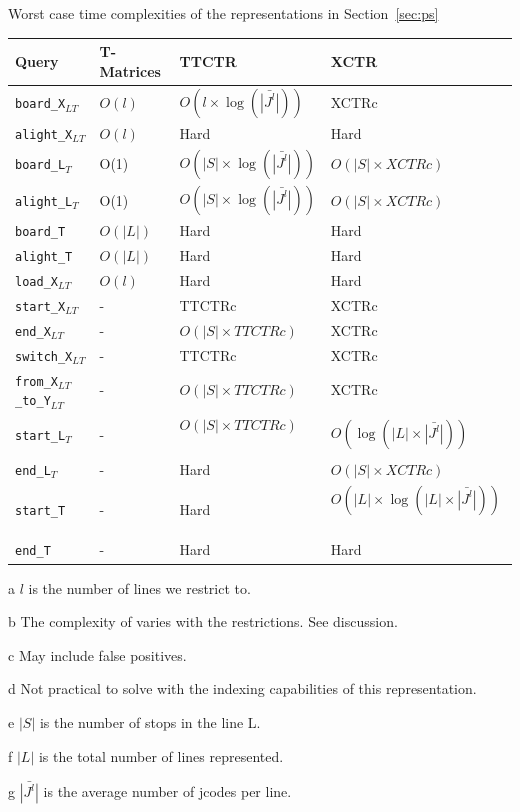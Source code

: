 \documentclass[runningheads]{llncs}
\newcommand{\acumm}{T-Matrices} %
\newcommand{\ctr}{XCTR}
\newcommand{\ttctr}{TTCTR}
\newcommand{\ctrq}{XCTRc}
\newcommand{\ttctrq}{TTCTRc}
\begin{document}
\begin{threeparttable}
\centering
\caption{Worst case time complexities of the representations in Section~\ref{sec:ps}}
\label{tab:queries}
\begin{tabular}{|l|l|l|l|}
\hline
Query &  \acumm & \ttctr & \ctr\\
\hline
\texttt{board\_X$_{LT}$} & $O(l)$\tnote{a} & $O(l\times \log(\bar{|J^l|}))$\tnote{abg} & \ctrq\tnote{b} \\
\texttt{alight\_X$_{LT}$} & $O(l)$\tnote{a} & Hard\tnote{cd} & Hard\tnote{cd} \\
\texttt{board\_L$_T$} & O(1) & $O(|S|\times \log(\bar{|J^l|}))$\tnote{beg} & $O(|S| \times \ctrq)$\tnote{be} \\
\texttt{alight\_L$_T$} & O(1) & $O(|S|\times \log(\bar{|J^l|}))$\tnote{bceg} & $O(|S| \times \ctrq)$\tnote{bce} \\
\texttt{board\_T} & $O(|L|)$\tnote{f} & Hard\tnote{d} & Hard\tnote{d} \\
\texttt{alight\_T} & $O(|L|)$\tnote{f} & Hard\tnote{cd} & Hard\tnote{cd} \\
\texttt{load\_X$_{LT}$} & $O(l)$\tnote{a} & Hard\tnote{cd} & Hard\tnote{cd} \\
\hline
\texttt{start\_X$_{LT}$} & - & \ttctrq\tnote{b} & \ctrq\tnote{b} \\
\texttt{end\_X$_{LT}$} & - & $O(|S|\times \ttctrq)$\tnote{be} & \ctrq\tnote{b} \\
\texttt{switch\_X$_{LT}$} & - & \ttctrq\tnote{b} & \ctrq\tnote{b} \\
\texttt{from\_X$_{LT}$\_to\_Y$_{LT}$} & - & $O(|S|\times \ttctrq)$\tnote{be} & \ctrq\tnote{b} \\
\texttt{start\_L$_T$} & - & $O(|S|\times \ttctrq)$\tnote{be}~~~ & $O(\log(|L|\times\bar{|J^l|}))$\tnote{fg} \\
\texttt{end\_L$_T$} & - & Hard\tnote{d} & $O(|S| \times \ctrq)$\tnote{be} \\
\texttt{start\_T} & - & Hard\tnote{d} & $O(|L| \times \log(|L|\times\bar{|J^l|}))$\tnote{fg}~~ \\
\texttt{end\_T} & - & Hard\tnote{d} & Hard\tnote{d} \\
\hline
\end{tabular}

\begin{tablenotes}
\item[a] $l$ is the number of lines we restrict to.
\item[b] The complexity of varies with the restrictions. See discussion.
\item[c] May include false positives.
\item[d] Not practical to solve with the indexing capabilities of this representation.
\item[e] $|S|$ is the number of stops in the line L.
\item[f] $|L|$ is the total number of lines represented.
\item[g] $\bar{|J^l|}$ is the average number of jcodes per line.
\end{tablenotes}
\end{threeparttable}
\end{document}
